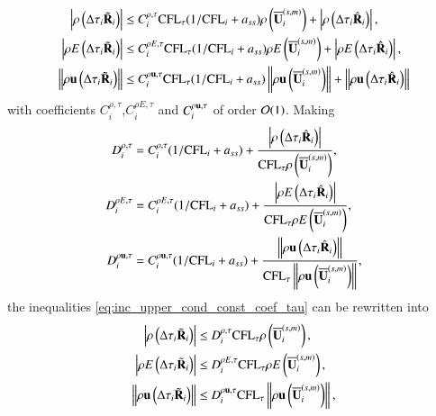 \begin{equation}
    \begin{aligned}
    \label{eq:inc_upper_cond_const_coef_tau}
        \left| \rho\left( \mathrm\Delta\tau_i \tilde{\mathbf{R}}_i \right) \right|
        & \leq
        C^{\rho,\tau}_i \text{CFL}_\tau(1 / \text{CFL}_i + a_{ss})
        \rho\left( \overline{\mathbf{U}}_i^{\left(s,m\right)} \right)
        + \left| \rho\left(\mathrm\Delta\tau_i\hat{\mathbf{R}}_i\right) \right|,\\
        \left| \rho E\left(\mathrm\Delta\tau_i \tilde{\mathbf{R}}_i \right) \right|
        & \leq
        C^{\rho E,\tau}_i \text{CFL}_\tau(1 / \text{CFL}_i + a_{ss})
        \rho E\left( \overline{\mathbf{U}}_i^{\left(s,m\right)} \right)
        + \left | \rho E\left(\mathrm\Delta\tau_i\hat{\mathbf{R}}_i\right) \right|,\\
        \left\| \rho \mathbf{u}\left( \mathrm\Delta\tau_i \tilde{\mathbf{R}}_i \right) \right\|
        & \leq
        C^{\rho \mathbf{u},\tau}_i \text{CFL}_\tau(1 / \text{CFL}_i + a_{ss})
        \left\| \rho \mathbf{u}\left( \overline{\mathbf{U}}_i^{\left(s,m\right)} \right)              \right\| + \left\|\rho\mathbf{u}\left(\mathrm\Delta\tau_i\hat{\mathbf{R}}_i\right) \right\|\\
    \end{aligned}
\end{equation}
with coefficients $C^{\rho ,\tau}_i$,$C^{\rho E,\tau}_i$ and $C^{\rho \mathbf{u},\tau}_i$
of order $\mathcal{O}(1)$.
Making
\begin{equation}
    \begin{aligned}
    \label{eq:inc_upper_cond_const_coef_tau_recast_method}
        D^{\rho,\tau}_i
        & =
        C^{\rho,\tau}_i (1 / \text{CFL}_i + a_{ss})
        + \frac{\left| \rho\left(\mathrm\Delta\tau_i \hat{\mathbf{R}}_i\right) \right|}
        { \text{CFL}_\tau\rho\left( \overline{\mathbf{U}}_i^{\left(s,m\right)} \right)},
        \\
        D^{\rho E,\tau}_i
        & =
        C^{\rho E,\tau}_i (1 / \text{CFL}_i + a_{ss})
        + \frac{\left| \rho E\left(\mathrm\Delta\tau_i \hat{\mathbf{R}}_i\right) \right|}
        { \text{CFL}_\tau\rho E\left( \overline{\mathbf{U}}_i^{\left(s,m\right)} \right)},
        \\
        D^{\rho \mathbf{u},\tau}_i
        & =
        C^{\rho \mathbf{u},\tau}_i (1 / \text{CFL}_i + a_{ss})
        + \frac{\left\|\rho\mathbf{u}\left(\mathrm\Delta\tau_i \hat{\mathbf{R}}_i\right) \right\|}
        { \text{CFL}_\tau\left\|\rho \mathbf{u}\left( \overline{\mathbf{U}}_i^{\left(s,m\right)} \right)\right\|}
        ,\\
    \end{aligned}
\end{equation}
the inequalities \eqref{eq:inc_upper_cond_const_coef_tau} can be 
rewritten into 
\begin{equation}
    \begin{aligned}
    \label{eq:inc_upper_cond_const_coef_tau_recasted}
        \left| \rho\left( \mathrm\Delta\tau_i \tilde{\mathbf{R}}_i \right) \right|
        & \leq
        D^{\rho,\tau}_i \text{CFL}_\tau
        \rho\left( \overline{\mathbf{U}}_i^{\left(s,m\right)} \right)
        ,\\
        \left| \rho E\left(\mathrm\Delta\tau_i \tilde{\mathbf{R}}_i \right) \right|
        & \leq
        D^{\rho E,\tau}_i \text{CFL}_\tau
        \rho E\left( \overline{\mathbf{U}}_i^{\left(s,m\right)} \right)
        ,\\
        \left\| \rho \mathbf{u}\left( \mathrm\Delta\tau_i \tilde{\mathbf{R}}_i \right) \right\|
        & \leq
        D^{\rho \mathbf{u},\tau}_i \text{CFL}_\tau
        \left\| \rho \mathbf{u}\left( \overline{\mathbf{U}}_i^{\left(s,m\right)} \right)              \right\| 
        ,\\
    \end{aligned}
\end{equation}
